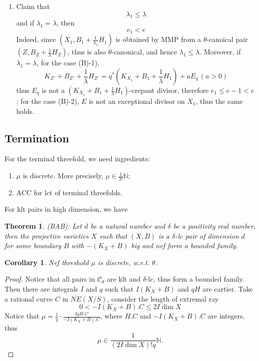 \documentclass{article}
\newtheorem{thm}[defn]{Theorem}
\newtheorem{cor}[defn]{Corollary}
\begin{document}
\begin{enumerate}[(A)]
\begin{enumerate}[1)]
\item Claim that
$$ \lambda_1\leqslant \lambda $$
and if $ \lambda_1=\lambda $, then
$$ e_1<e $$
Indeed, since $ (X_1,B_1+\frac{1}{\lambda_1}H_1) $ is obtained by MMP from a $ \theta $-canoical pair $ (Z,B_Z+\frac{1}{\lambda}H_Z) $, thus is also $ \theta $-canonical, and hence $ \lambda_1\leqslant \lambda $. Moreover, if $ \lambda_1=\lambda $, for the case (B)-1),
$$ K_{Z'}+B_{Z'}+\frac{1}{\lambda}H_{Z'}=q^*(K_{X_1}+B_1+\frac{1}{\lambda}H_1)+aE_q\, (a>0) $$
thus $ E_q $ is not a $ (K_{X_1}+B_1+\frac{1}{\lambda}H_1) $-crepant divisor, therefore $ e_1\leqslant e-1<e $; for the case (B)-2), $ E $ is not an exceptional divisor on $ X_1 $, thus the same holds.
\end{enumerate}
\end{enumerate}

\subsection{Termination}
For the terminal threefold, we need ingredients:
\begin{enumerate}
\item $ \mu $ is discrete. More precisely, $ \mu\in \frac{1}{3!}\mathbb{N} $;
\item ACC for lct of terminal threefolds.
\end{enumerate}
For klt pairs in high dimension, we have
\begin{thm}
(BAB): Let $ d $ be a natural number and $ \delta $ be a positivity real number, then the projective varieties $ X $ such that $ (X,B) $ is a $ \delta $-lc pair of dimension $ d $ for some boundary $ B $ with $ -(K_X+B) $ big  and nef form a bounded family.
\end{thm}

\begin{cor}
Nef threshold $ \mu $ is discrete, w.r.t. $ \theta $.
\end{cor}
\begin{proof}
Notice that all pairs in $ \mathcal{C}_\theta $ are klt and $ \delta $-lc, thus form a bounded family. Then there are integrals $ I $ and $ q $ such that $ I(K_X+B) $ and $ qH $ are cartier. Take a rational curve $ C $ in $ \overline{NE}(X/S) $, consider the length of extremal ray
$$ 0<-I(K_X+B).C\leqslant 2I\dim X $$
Notice that $ \mu=\frac{1}{q}\cdot\frac{IqH.C}{-I(K_X+B).C} $, where $ H.C $ and $ -I(K_X+B).C $ are integers, thus
$$ \mu\in \frac{1}{(2I\dim X)!q}\mathbb{N}.  $$
\end{proof}
\end{document}
